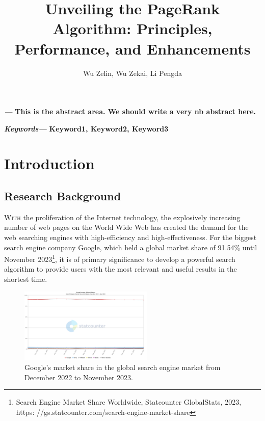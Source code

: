 \documentclass[lettersize,journal,12pt]{IEEEtran}
\renewenvironment{abstract}
{\fontsize{12}{14}\textit{\textbf{\abstractname---}}\bfseries\ignorespaces}
{}
\renewenvironment{IEEEkeywords}
{\fontsize{12}{14}\textit{\textbf{Keywords---}}\bfseries\ignorespaces}{}
\begin{document}
\onehalfspacing
\title{Unveiling the PageRank Algorithm: Principles, Performance, and Enhancements}
\author{Wu Zelin, Wu Zekai, Li Pengda}

\maketitle\thispagestyle{headings}
%

\begin{abstract}
	This is the abstract area. We should write a very nb abstract here.
\end{abstract}

\begin{IEEEkeywords}
	Keyword1, Keyword2, Keyword3
\end{IEEEkeywords}


\section{Introduction}

\subsection{Research Background}

\lettrine{W}{ith} 
the proliferation of the Internet technology, the explosively increasing number of web pages on the World Wide Web has created the demand for the web searching engines with high-efficiency and high-effectiveness. 
For the biggest search engine company Google, which held a global market share of 91.54\% until November 2023\footnote[1]{Search Engine Market Share Worldwide, Statcounter GlobalStats, 2023, https:
//gs.statcounter.com/search-engine-market-share}, it is of primary significance to develop a powerful search algorithm to provide users with the most relevant and useful results in the shortest time. 

\begin{figure}[h]
    \centering
    \includegraphics[width=2.5in]{images/fig2.png}
    \caption{Google's market share in the global search engine market from December 2022 to November 2023.}
    \label{fig1}
\end{figure}
\end{document}
